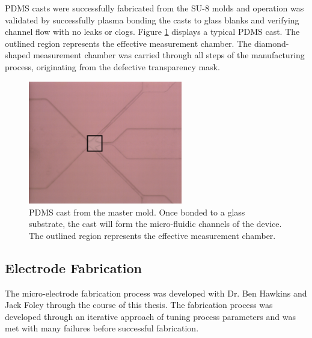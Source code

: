 \FloatBarrier

\par PDMS casts were successfully fabricated from the SU-8 molds and operation was validated by successfully plasma bonding the casts to glass blanks and verifying channel flow with no leaks or clogs. Figure \ref{fig:pdms_results} displays a typical PDMS cast. The outlined region represents the effective measurement chamber. The diamond-shaped measurement chamber was carried through all steps of the manufacturing process, originating from the defective transparency mask.

\begin{figure}[H]
    \centering
    \includegraphics[width=0.6\textwidth]{images/pdms_channels_outline.png}
    \caption{PDMS cast from the master mold. Once bonded to a glass substrate, the cast will form the micro-fluidic channels of the device. The outlined region represents the effective measurement chamber.}
    \label{fig:pdms_results}
\end{figure}

\FloatBarrier


\subsection{Electrode Fabrication}

\par The micro-electrode fabrication process was developed with Dr. Ben Hawkins and Jack Foley through the course of this thesis. The fabrication process was developed through an iterative approach of tuning process parameters and was met with many failures before successful fabrication.


